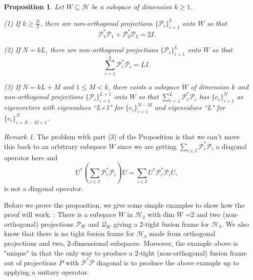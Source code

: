 \documentclass[11pt,reqno]{amsart}
\newtheorem{proposition}[thm]{Proposition}
\theoremstyle{remark}
\newtheorem{remark}[thm]{Remark}
\begin{document}
\begin{proposition}\label{prop3}
Let $W\subseteq\mathcal{H}$ be a subspace of dimension
$k\ge 1$.

(1)  If $k\geq \frac{N}{2}$, there are
non-orthogonal projections $\{{\mathcal P}_i\}_{i=1}^{2}$ onto $W$ so that
\[ {\mathcal P}_1^{*}{\mathcal P}_1 + {\mathcal P}_{2}^*{\mathcal P}_2 = 2I.\]

(2)  If $N=kL$, there are
non-orthogonal projections $\{{\mathcal P}_i\}_{i=1}^{L}$ onto $W$ so that
\[ \sum_{i=1}^{L}{\mathcal P}_i^{*}{\mathcal P}_i = LI.\]

(3)  If $N=kL+M$ and $1\le M<k$, there exists a subspace $W$
of dimension $k$ and
non-orthogonal projections $\{{\mathcal P}_i\}_{i=1}^{L+1}$ onto $W$ so that
$\sum_{i=1}^{L}{\mathcal P}_i^{*}{\mathcal P}_i$ has $\{e_i\}_{i=1}^N$ as eigenvectors
with eigenvalues ``L+1" for $\{e_i\}_{i=1}^{N-M}$ and eigenvalues ``L"
for $\{e_i\}_{i=N-M+1}^N$.
\end{proposition}

\begin{remark}
The problem with part (3) of the Proposition is that we can't move this back
to an arbitrary subspace $W$ since we are getting $\sum_{i\in I}{\mathcal P}_i^*{\mathcal P}_i$ a diagonal operator
here and
\[ U^*\left ( \sum_{i\in I} {\mathcal P}_i^* {\mathcal P}_i \right ) U= \sum_{i\in I}U^*{\mathcal P}_i^*{\mathcal P}_iU,\]
is not a diagonal operator.
\end{remark}

Before we prove the proposition, we give some simple examples to
show how the proof will work.
\vskip12pt
:  There is a subspace $W$ in ${\mathcal H}_3$
with dim $W$ =2 and two (non-orthogonal) projections ${\mathcal P}_W$ and ${\mathcal Q}_W$
giving a 2-tight fusion frame for ${\mathcal H}_3$.
We also know \cite{CFMWZ10} that there is no tight fusion frame
for ${\mathcal H}_3$ made from orthogonal projections and two, $2$-dimensional
subspaces.   Moreover,
the example above is "unique" in that the only way to produce
a 2-tight (non-orthogonal) fusion frame out of projections $P$
with ${\mathcal P}^{*}{\mathcal P}$ diagonal is to produce the above example up to applying a unitary operator.
\vskip12pt
\end{document}
